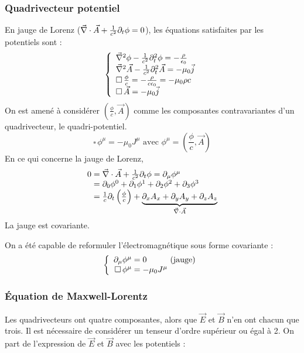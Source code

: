 \subsubsection{Quadrivecteur potentiel}
En jauge de Lorenz ($\vec{\nabla}\cdot\vec{A}+\frac{1}{c^2}\partial_t\phi=0$), les équations satisfaites par les potentiels sont :
$$
	\left\{ \begin{array}{l}
		\vec{\nabla}^2\phi - \frac{1}{c^2}\partial_t^2\phi=-\frac{\rho}{\epsilon_0}\\
		\vec{\nabla}^2\vec{A}-\frac{1}{c^2}\partial_t^2\vec{A}=-\mu_0\vec{j}\\
		\square\,\frac{\phi}{c}=-\frac{\rho}{c\epsilon_0}=-\mu_0\rho c\\
		\square\,\vec{A}=-\mu_0\vec{j}
	\end{array} \right.
$$
{\txt On est amené à considérer $(\frac{\phi}{c},\vec{A})$ comme les composantes contravariantes d'un quadrivecteur, le quadri-potentiel.}
$$
	\square\,\phi^\mu=-\mu_0J^\mu
	\text{ avec } \phi^\mu=(\frac{\phi}{c},\vec{A})
$$
En ce qui concerne la jauge de Lorenz,
$$
	\begin{array}{r@{\;}l}
		0&=\nab\cdot\vec{A}+\frac{1}{c^2}\partial_t\phi=\partial_\mu\phi^\mu\\
		&=\partial_0\phi^0+\partial_1\phi^1+\partial_2\phi^2+\partial_3\phi^3\\
		&=\frac{1}{c}\partial_t\left(\frac{\phi}{c}\right)+\underbrace{\partial_xA_x+\partial_yA_y+\partial_zA_z}_{\nab\cdot\vec{A}}
	\end{array}
$$
La jauge est covariante.

\begin{conc}
	On a été capable de reformuler l'électromagnétique sous forme covariante :
	$$
		\left\{ \begin{array}{r@{\;}l}
			\partial_\mu\phi^\mu&=0\text{\hspace{1cm}(jauge)}\\
			\square\,\phi^\mu&=-\mu_0J^\mu
		\end{array} \right.
	$$
\end{conc}

\subsubsection{Équation de Maxwell-Lorentz}
	Les quadrivecteurs ont quatre composantes, alors que $\vec{E}$ et $\vec{B}$ n'en ont chacun que trois. Il est nécessaire de considérer un tenseur d'ordre supérieur ou égal à 2. On part de l'expression de $\vec{E}$ et $\vec{B}$ avec les potentiels :

